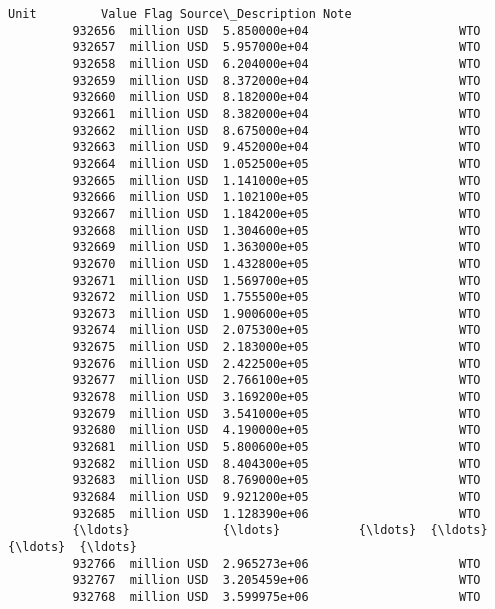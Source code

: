 \documentclass[11pt]{article}
\begin{document}
\begin{Verbatim}[commandchars=\\\{\}]
                        Unit         Value Flag Source\_Description Note  
         932656  million USD  5.850000e+04                     WTO       
         932657  million USD  5.957000e+04                     WTO       
         932658  million USD  6.204000e+04                     WTO       
         932659  million USD  8.372000e+04                     WTO       
         932660  million USD  8.182000e+04                     WTO       
         932661  million USD  8.382000e+04                     WTO       
         932662  million USD  8.675000e+04                     WTO       
         932663  million USD  9.452000e+04                     WTO       
         932664  million USD  1.052500e+05                     WTO       
         932665  million USD  1.141000e+05                     WTO       
         932666  million USD  1.102100e+05                     WTO       
         932667  million USD  1.184200e+05                     WTO       
         932668  million USD  1.304600e+05                     WTO       
         932669  million USD  1.363000e+05                     WTO       
         932670  million USD  1.432800e+05                     WTO       
         932671  million USD  1.569700e+05                     WTO       
         932672  million USD  1.755500e+05                     WTO       
         932673  million USD  1.900600e+05                     WTO       
         932674  million USD  2.075300e+05                     WTO       
         932675  million USD  2.183000e+05                     WTO       
         932676  million USD  2.422500e+05                     WTO       
         932677  million USD  2.766100e+05                     WTO       
         932678  million USD  3.169200e+05                     WTO       
         932679  million USD  3.541000e+05                     WTO       
         932680  million USD  4.190000e+05                     WTO       
         932681  million USD  5.800600e+05                     WTO       
         932682  million USD  8.404300e+05                     WTO       
         932683  million USD  8.769000e+05                     WTO       
         932684  million USD  9.921200e+05                     WTO       
         932685  million USD  1.128390e+06                     WTO       
         {\ldots}             {\ldots}           {\ldots}  {\ldots}                {\ldots}  {\ldots}  
         932766  million USD  2.965273e+06                     WTO       
         932767  million USD  3.205459e+06                     WTO       
         932768  million USD  3.599975e+06                     WTO       

\end{Verbatim}
\end{document}
